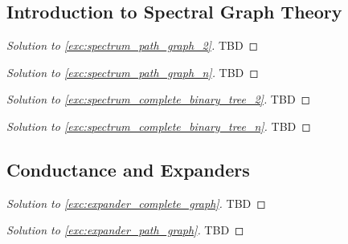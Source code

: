 \section{}

\subsection{Introduction to Spectral Graph Theory}

\begin{proof}[Solution to \cref{exc:spectrum_path_graph_2}] TBD
\end{proof}

\begin{proof}[Solution to \cref{exc:spectrum_path_graph_n}] TBD
\end{proof}

\begin{proof}[Solution to \cref{exc:spectrum_complete_binary_tree_2}] TBD
\end{proof}

\begin{proof}[Solution to \cref{exc:spectrum_complete_binary_tree_n}] TBD
\end{proof}

\subsection{Conductance and Expanders}

\begin{proof}[Solution to \cref{exc:expander_complete_graph}] TBD
\end{proof}

\begin{proof}[Solution to \cref{exc:expander_path_graph}] TBD
\end{proof}